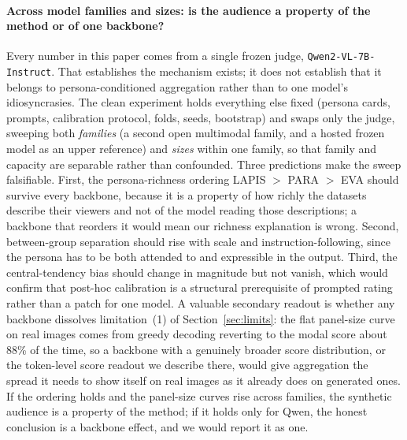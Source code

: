 \documentclass[10pt,twocolumn,letterpaper]{article}
\begin{document}
\paragraph{Across model families and sizes: is the audience a property of the method or of one backbone?} Every number in this paper comes from a single frozen judge, \texttt{Qwen2-VL-7B-Instruct}. That establishes the mechanism exists; it does not establish that it belongs to persona-conditioned aggregation rather than to one model's idiosyncrasies. The clean experiment holds everything else fixed (persona cards, prompts, calibration protocol, folds, seeds, bootstrap) and swaps only the judge, sweeping both \emph{families} (a second open multimodal family, and a hosted frozen model as an upper reference) and \emph{sizes} within one family, so that family and capacity are separable rather than confounded. Three predictions make the sweep falsifiable. First, the persona-richness ordering LAPIS $>$ PARA $>$ EVA should survive every backbone, because it is a property of how richly the datasets describe their viewers and not of the model reading those descriptions; a backbone that reorders it would mean our richness explanation is wrong. Second, between-group separation should rise with scale and instruction-following, since the persona has to be both attended to and expressible in the output. Third, the central-tendency bias should change in magnitude but not vanish, which would confirm that post-hoc calibration is a structural prerequisite of prompted rating rather than a patch for one model. A valuable secondary readout is whether any backbone dissolves limitation~(1) of Section~\ref{sec:limits}: the flat panel-size curve on real images comes from greedy decoding reverting to the modal score about 88\% of the time, so a backbone with a genuinely broader score distribution, or the token-level score readout we describe there, would give aggregation the spread it needs to show itself on real images as it already does on generated ones. If the ordering holds and the panel-size curves rise across families, the synthetic audience is a property of the method; if it holds only for Qwen, the honest conclusion is a backbone effect, and we would report it as one.
\end{document}
